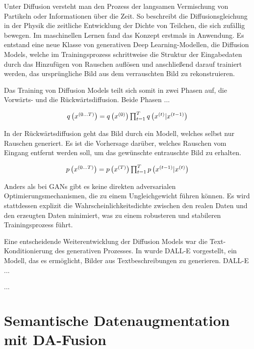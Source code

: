 Unter Diffusion versteht man den Prozess der langsamen Vermischung von Partikeln oder Informationen über die Zeit. So beschreibt die Diffusionsgleichung in der Physik die zeitliche Entwicklung der Dichte von Teilchen, die sich zufällig bewegen. Im maschinellen Lernen fand das Konzept erstmals in \cite{} Anwendung. Es entstand eine neue Klasse von generativen Deep Learning-Modellen, die Diffusion Models, welche im Trainingsprozess schrittweise die Struktur der Eingabedaten durch das Hinzufügen von Rauschen auflösen und anschließend darauf trainiert werden, das ursprüngliche Bild aus dem verrauschten Bild zu rekonstruieren.

Das Training von Diffusion Models teilt sich somit in zwei Phasen auf, die Vorwärts- und die Rückwärtsdiffusion. Beide Phasen ...

\begin{equation} \label{eq-forward-diffusion}
	$$q \left( x^{(0 \dots T)} \right) = q \left(x^{(0)}\right)\prod_{t=1}^T q \left(x^{(t)}|x^{(t-1)}\right)$$
\end{equation}

In der Rückwärtsdiffusion geht das Bild durch ein Modell, welches selbst nur Rauschen generiert. Es ist die Vorhersage darüber, welches Rauschen vom Eingang entfernt werden soll, um das gewünschte entrauschte Bild zu erhalten.

\begin{equation} \label{eq-reverse-diffusion}
	$$p \left( x^{(0 \dots T)} \right) = p \left(x^{(T)}\right)\prod_{t=1}^T p \left(x^{(t-1)}|x^{(t)}\right)$$
\end{equation}

Anders als bei GANs gibt es keine direkten adversarialen Optimierungsmechanismen, die zu einem Ungleichgewicht führen können. Es wird stattdessen explizit die Wahrscheinlichkeitsdichte zwischen den realen Daten und den erzeugten Daten minimiert, was zu einem robusteren und stabileren Trainingsprozess führt.

Eine entscheidende Weiterentwicklung der Diffusion Models war die Text-Konditionierung des generativen Prozesses. In \cite{} wurde DALL-E vorgestellt, ein Modell, das es ermöglicht, Bilder aus Textbeschreibungen zu generieren. DALL-E ...

...

\section{Semantische Datenaugmentation mit DA-Fusion} \label{sec-da-fusion}

